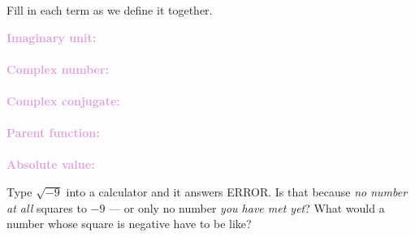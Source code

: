 \documentclass[10pt]{article}
\begin{document}

\vspace{0.12in}

\boxguard
\begin{vocabbox}
Fill in each term as we define it together.
\par\vspace{2pt}
\noindent\textbf{\textcolor{plum}{Imaginary unit:}}\\[1pt]
\writeline\\[3pt]
\noindent\textbf{\textcolor{plum}{Complex number:}}\\[1pt]
\writeline\\[3pt]
\noindent\textbf{\textcolor{plum}{Complex conjugate:}}\\[1pt]
\writeline\\[3pt]
\noindent\textbf{\textcolor{plum}{Parent function:}}\\[1pt]
\writeline\\[3pt]
\noindent\textbf{\textcolor{plum}{Absolute value:}}\\[1pt]
\writeline
\end{vocabbox}

\vspace{0.1in}

\boxguard
\begin{hookbox}
Type $\sqrt{-9}$ into a calculator and it answers \textsf{ERROR}. Is that because
\emph{no number at all} squares to $-9$ --- or only no number \emph{you have met yet}? What
would a number whose square is negative have to be like?
\end{hookbox}
\end{document}
